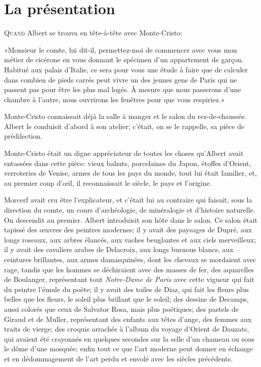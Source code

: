 \chapter{La présentation}

\lettrine{Q}{uand} Albert se trouva en tête-à-tête avec Monte-Cristo: 

\zz
«Monsieur le comte, lui dit-il, permettez-moi de commencer avec vous mon métier de cicérone en vous donnant le spécimen d'un appartement de garçon. Habitué aux palais d'Italie, ce sera pour vous une étude à faire que de calculer dans combien de pieds carrés peut vivre un des jeunes gens de Paris qui ne passent pas pour être les plus mal logés. À mesure que nous passerons d'une chambre à l'autre, nous ouvrirons les fenêtres pour que vous respiriez.» 

Monte-Cristo connaissait déjà la salle à manger et le salon du rez-de-chaussée. Albert le conduisit d'abord à son atelier; c'était, on se le rappelle, sa pièce de prédilection. 

Monte-Cristo était un digne appréciateur de toutes les choses qu'Albert avait entassées dans cette pièce: vieux bahuts, porcelaines du Japon, étoffes d'Orient, verroteries de Venise, armes de tous les pays du monde, tout lui était familier, et, au premier coup d'œil, il reconnaissait le siècle, le pays et l'origine. 

Morcerf avait cru être l'explicateur, et c'était lui au contraire qui faisait, sous la direction du comte, un cours d'archéologie, de minéralogie et d'histoire naturelle. On descendit au premier. Albert introduisit son hôte dans le salon. Ce salon était tapissé des œuvres des peintres modernes; il y avait des paysages de Dupré, aux longs roseaux, aux arbres élancés, aux vaches beuglantes et aux ciels merveilleux; il y avait des cavaliers arabes de Delacroix, aux longs burnous blancs, aux ceintures brillantes, aux armes damasquinées, dont les chevaux se mordaient avec rage, tandis que les hommes se déchiraient avec des masses de fer, des aquarelles de Boulanger, représentant tout \textit{Notre-Dame de Paris} avec cette vigueur qui fait du peintre l'émule du poète; il y avait des toiles de Diaz, qui fait les fleurs plus belles que les fleurs, le soleil plus brillant que le soleil; des dessins de Decamps, aussi colorés que ceux de Salvator Rosa, mais plus poétiques; des pastels de Giraud et de Muller, représentant des enfants aux têtes d'ange, des femmes aux traits de vierge; des croquis arrachés à l'album du voyage d'Orient de Dauzats, qui avaient été crayonnés en quelques secondes sur la selle d'un chameau ou sous le dôme d'une mosquée; enfin tout ce que l'art moderne peut donner en échange et en dédommagement de l'art perdu et envolé avec les siècles précédents. 

